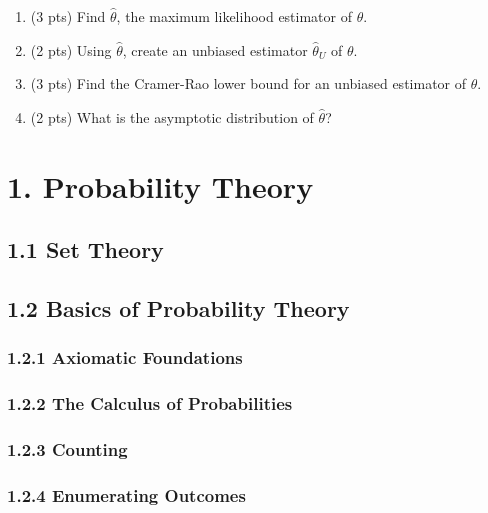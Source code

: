\documentclass[6pt,twocolumn,Portrait]{article}
\begin{document}
\begin{enumerate}
\def\labelenumi{(\alph{enumi})}
\item
  (3 pts) Find \(\hat\theta\), the maximum likelihood estimator of
  \(\theta\).
\item
  (2 pts) Using \(\hat\theta\), create an unbiased estimator
  \(\hat\theta_U\) of \(\theta\).
\item
  (3 pts) Find the Cramer-Rao lower bound for an unbiased estimator of
  \(\theta\).
\item
  (2 pts) What is the asymptotic distribution of \(\hat\theta\)?
\end{enumerate}

\hypertarget{probability-theory}{%
\section{1. Probability Theory}\label{probability-theory}}

\hypertarget{set-theory}{%
\subsection{1.1 Set Theory}\label{set-theory}}

\hypertarget{basics-of-probability-theory}{%
\subsection{1.2 Basics of Probability
Theory}\label{basics-of-probability-theory}}

\hypertarget{axiomatic-foundations}{%
\subsubsection{1.2.1 Axiomatic
Foundations}\label{axiomatic-foundations}}

\hypertarget{the-calculus-of-probabilities}{%
\subsubsection{1.2.2 The Calculus of
Probabilities}\label{the-calculus-of-probabilities}}

\hypertarget{counting}{%
\subsubsection{1.2.3 Counting}\label{counting}}

\hypertarget{enumerating-outcomes}{%
\subsubsection{1.2.4 Enumerating Outcomes}\label{enumerating-outcomes}}
\end{document}
